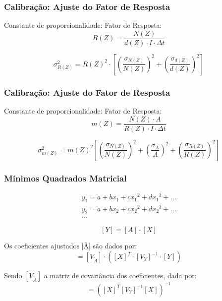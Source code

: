 \begin{frame}
  \frametitle{Calibração: Ajuste do Fator de Resposta}
  Constante de proporcionalidade: Fator de Resposta:
\begin{equation*}
  \label{eq:fator_de_resposta}
  R(Z) = \frac{N(Z)}{d(Z) \cdot I \cdot \Delta t}
\end{equation*}

\begin{equation*}
  \label{eq:erro_fator_de_resposta}
  \sigma_{R(Z)}^2 = {R(Z)}^2 \cdot \left[ \left(\frac{\sigma_{N(Z)}}{N(Z)}\right)^2 + 
                                      \left(\frac{\sigma_{d(Z)}}{d(Z)}\right)^2 
                                   \right]
\end{equation*}
\end{frame}

\begin{frame}
  \frametitle{Calibração: Ajuste do Fator de Resposta}
  Constante de proporcionalidade: Fator de Resposta:
\begin{equation*}
  \label{eq:xrfedmassa}
  m(Z) = \frac{N(Z) \cdot A}{ R(Z) \cdot I \cdot \Delta t}
\end{equation*}

\begin{equation*}
  \label{eq:erro_massa}
  \sigma_{m(Z)}^2 = {m(Z)}^2 \left[ \left(\frac{\sigma_{N(Z)}}{N(Z)}\right)^2 + 
                                  \left(\frac{\sigma_A}{A}\right)^2 + 
                                  \left(\frac{\sigma_{R(Z)}}{R(Z)}\right)^2 
                             \right]
\end{equation*}
\end{frame}

\begin{frame}
  \frametitle{Mínimos Quadrados Matricial}
\begin{equation*}
  \label{eq:polinomio}
  \begin{split}
    y_1 = a + b x_1 + c{x_1}^2 + d{x_1}^3 + ...\\
    y_2 = a + b x_2 + c{x_2}^2 + d{x_2}^3 + ... \\
    ...
  \end{split}
\end{equation*}

\begin{equation*}
  \label{eq:polinomioMatriz}
  [Y] = [A] \cdot [X]
\end{equation*}

Os coeficientes ajustados [Ã] são dados por:
\begin{equation*}
  [\tilde{A}] = [V_{\tilde{A}}] \cdot ([X]^T \cdot {[V_Y]}^{-1} \cdot [Y])
\end{equation*}

Sendo $[V_{\tilde{A}}]$ a matriz de covariância dos coeficientes, dada por:
\begin{equation*}
  [V_{\tilde{A}}] = ([X]^T [V_Y]^{-1} [X])^{-1}
\end{equation*}
\end{frame}

